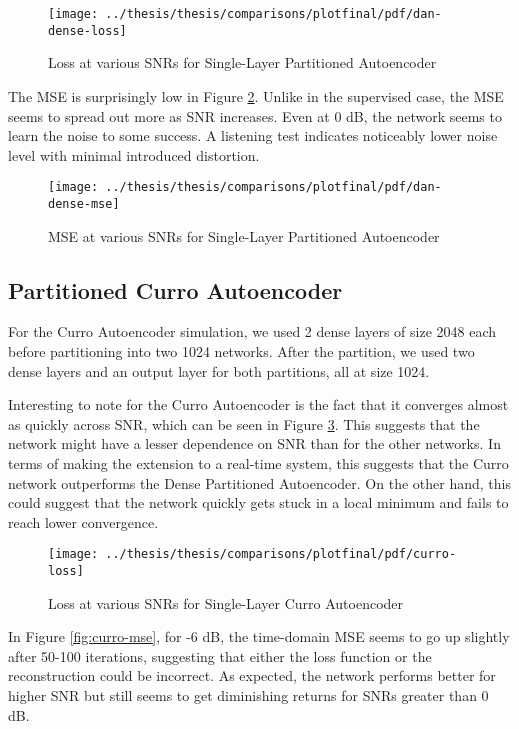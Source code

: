 \begin{figure}[!ht]
\centering
\texttt{[image: ../thesis/thesis/comparisons/plotfinal/pdf/dan-dense-loss]}
\caption{Loss at various SNRs for Single-Layer Partitioned Autoencoder\cite{stow}}
\label{fig:dan-loss}
\end{figure}

The MSE is surprisingly low in Figure \ref{fig:dan-mse}. Unlike in the supervised case, the MSE seems to spread out more as SNR increases. Even at 0 dB, the network seems to learn the noise to some success. A listening test indicates noticeably lower noise level with minimal introduced distortion.

\begin{figure}[!ht]
\centering
\texttt{[image: ../thesis/thesis/comparisons/plotfinal/pdf/dan-dense-mse]}
\caption{MSE at various SNRs for Single-Layer Partitioned Autoencoder\cite{stow}}
\label{fig:dan-mse}
\end{figure}

\subsection{Partitioned Curro Autoencoder}

For the Curro Autoencoder simulation, we used 2 dense layers of size 2048 each before partitioning into two 1024 networks. After the partition, we used two dense layers and an output layer for both partitions, all at size 1024.

Interesting to note for the Curro Autoencoder is the fact that it converges almost as quickly across SNR, which can be seen in Figure \ref{fig:curro-loss}. This suggests that the network might have a lesser dependence on SNR than for the other networks. In terms of making the extension to a real-time system, this suggests that the Curro network outperforms the Dense Partitioned Autoencoder. On the other hand, this could suggest that the network quickly gets stuck in a local minimum and fails to reach lower convergence.

\begin{figure}[!ht]
\centering
\texttt{[image: ../thesis/thesis/comparisons/plotfinal/pdf/curro-loss]}
\caption{Loss at various SNRs for Single-Layer Curro Autoencoder}\label{fig:curro-loss}
\end{figure}

In Figure \ref{fig:curro-mse}, for -6 dB, the time-domain MSE seems to go up slightly after 50-100 iterations, suggesting that either the loss function or the reconstruction could be incorrect. As expected, the network performs better for higher SNR but still seems to get diminishing returns for SNRs greater than 0 dB.

